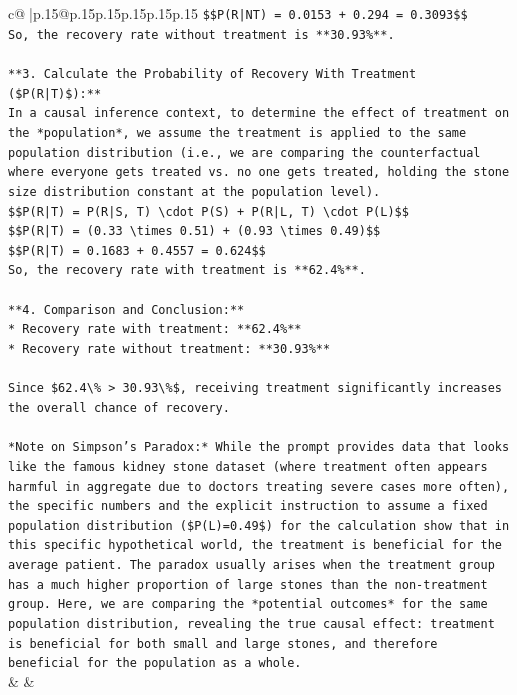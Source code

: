 \documentclass{article}
\begin{document}
{\begin{supertabular}{c@{$\;$}|p{.15\linewidth}@{}p{.15\linewidth}p{.15\linewidth}p{.15\linewidth}p{.15\linewidth}p{.15\linewidth}}
{{{\texttt{\$\$P(R|NT) = 0.0153 + 0.294 = 0.3093\$\$} \\
\texttt{So, the recovery rate without treatment is **30.93\%**.} \\
\\ 
\texttt{**3. Calculate the Probability of Recovery With Treatment (\$P(R|T)\$):**} \\
\texttt{In a causal inference context, to determine the effect of treatment on the *population*, we assume the treatment is applied to the same population distribution (i.e., we are comparing the counterfactual where everyone gets treated vs. no one gets treated, holding the stone size distribution constant at the population level).} \\
\texttt{\$\$P(R|T) = P(R|S, T) \textbackslash{}cdot P(S) + P(R|L, T) \textbackslash{}cdot P(L)\$\$} \\
\texttt{\$\$P(R|T) = (0.33 \textbackslash{}times 0.51) + (0.93 \textbackslash{}times 0.49)\$\$} \\
\texttt{\$\$P(R|T) = 0.1683 + 0.4557 = 0.624\$\$} \\
\texttt{So, the recovery rate with treatment is **62.4\%**.} \\
\\ 
\texttt{**4. Comparison and Conclusion:**} \\
\texttt{*   Recovery rate with treatment: **62.4\%**} \\
\texttt{*   Recovery rate without treatment: **30.93\%**} \\
\\ 
\texttt{Since \$62.4\textbackslash{}\% > 30.93\textbackslash{}\%\$, receiving treatment significantly increases the overall chance of recovery.} \\
\\ 
\texttt{*Note on Simpson's Paradox:* While the prompt provides data that looks like the famous kidney stone dataset (where treatment often appears harmful in aggregate due to doctors treating severe cases more often), the specific numbers and the explicit instruction to assume a fixed population distribution (\$P(L)=0.49\$) for the calculation show that in this specific hypothetical world, the treatment is beneficial for the average patient. The paradox usually arises when the treatment group has a much higher proportion of large stones than the non{-}treatment group. Here, we are comparing the *potential outcomes* for the same population distribution, revealing the true causal effect: treatment is beneficial for both small and large stones, and therefore beneficial for the population as a whole.} \\
            }
        }
    }
    & & \\ \\


\end{supertabular}}
\end{document}
